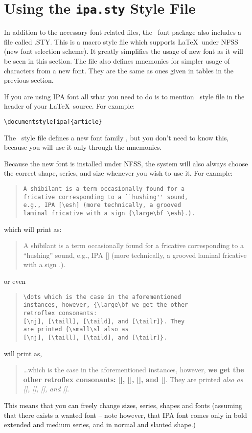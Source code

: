 \section{Using the {\tt{}ipa.sty} Style File}

In addition to the necessary font-related files, the \wsu\ font
package also includes a file called {\ipas.STY}. This is a macro style
file which supports \LaTeX\ under NFSS (new font selection scheme). It
greatly simplifies the usage of new font as it will be seen in this
section. The file also defines mnemonics for simpler usage of
characters from a new font. They are the same as ones given in tables
in the previous section.

If you are using IPA font all what you need to do is to mention \ipas\
style file in the header of your \LaTeX\ source. For example:
%
\begin{verbatim}
\documentstyle[ipa]{article}
\end{verbatim}

The \ipas\ style file defines a new font family , but you
don't need to know this, because you will use it only through the
mnemonics.

Because the new font is installed under NFSS, the system will also
always choose the correct shape, series, and size whenever you wish to
use it. For example:
%
\begin{quote}\begin{verbatim}
A shibilant is a term occasionally found for a
fricative corresponding to a ``hushing'' sound,
e.g., IPA [\esh] (more technically, a grooved
laminal fricative with a sign {\large\bf \esh}.).
\end{verbatim}\end{quote}
%
which will print as:
%
\begin{quote}
A shibilant is a term occasionally found for a
fricative corresponding to a ``hushing'' sound,
e.g., IPA [\esh] (more technically, a grooved
laminal fricative with a sign {\large\bf \esh}.).
\end{quote}
%
or even
%
\begin{quote}\begin{verbatim}
\dots which is the case in the aforementioned
instances, however, {\large\bf we get the other
retroflex consonants:
[\nj], [\taill], [\taild], and [\tailr]}. They
are printed {\small\sl also as
[\nj], [\taill], [\taild], and [\tailr]}.
\end{verbatim}\end{quote}
%
will print as,
%
\begin{quote}
\dots which is the case in the aforementioned
instances, however, {\bf\large we get the
other retroflex consonants:
[\nj], [\taill], [\taild], and [\tailr]}. They
are printed {\sl\small also as
[\nj], [\taill], [\taild], and [\tailr]}.
\end{quote}
%
%
This means that you can freely change sizes, series, shapes and fonts
(assuming that there exists a wanted font -- note however, that IPA
font comes only in bold extended and medium series, and in normal and
slanted shape.)

